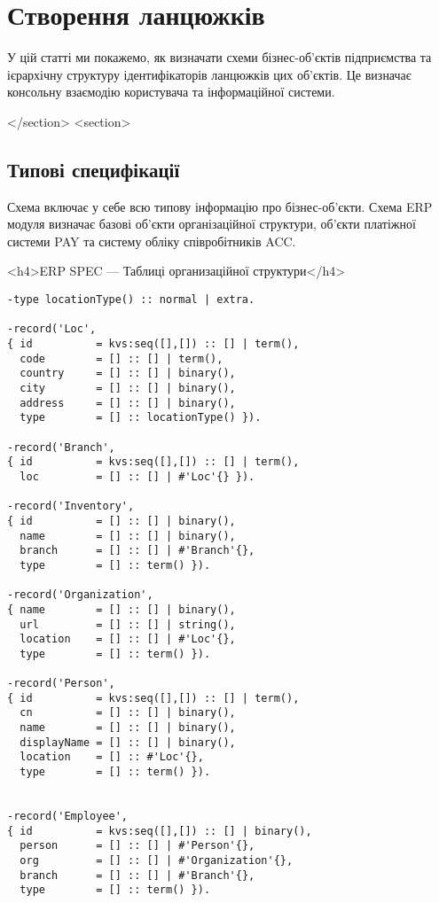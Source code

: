 \chapter{Створення ланцюжків}

        У цій статті ми покажемо, як визначати схеми бізнес-об'єктів
           підприємства та ієрархічну структуру ідентифікаторів ланцюжків
           цих об'єктів. Це визначає консольну взаємодію користувача
           та інформаційної системи.

    </section>
    <section>


        \section{Типові специфікації}

        Схема включає у себе всю типову інформацію про бізнес-об'єкти.
           Схема ERP модуля визначає базові об'єкти організаційної структури,
           об'єкти платіжної системи PAY та систему обліку співробітників ACC.

        <h4>ERP SPEC — Таблиці организаційної структури</h4>

   \begin{lstlisting}
-type locationType() :: normal | extra.

-record('Loc',
{ id          = kvs:seq([],[]) :: [] | term(),
  code        = [] :: [] | term(),
  country     = [] :: [] | binary(),
  city        = [] :: [] | binary(),
  address     = [] :: [] | binary(),
  type        = [] :: locationType() }).

-record('Branch',
{ id          = kvs:seq([],[]) :: [] | term(),
  loc         = [] :: [] | #'Loc'{} }).

-record('Inventory',
{ id          = [] :: [] | binary(),
  name        = [] :: [] | binary(),
  branch      = [] :: [] | #'Branch'{},
  type        = [] :: term() }).

-record('Organization',
{ name        = [] :: [] | binary(),
  url         = [] :: [] | string(),
  location    = [] :: [] | #'Loc'{},
  type        = [] :: term() }).

-record('Person',
{ id          = kvs:seq([],[]) :: [] | term(),
  cn          = [] :: [] | binary(),
  name        = [] :: [] | binary(),
  displayName = [] :: [] | binary(),
  location    = [] :: #'Loc'{},
  type        = [] :: term() }).


-record('Employee',
{ id          = kvs:seq([],[]) :: [] | binary(),
  person      = [] :: [] | #'Person'{},
  org         = [] :: [] | #'Organization'{},
  branch      = [] :: [] | #'Branch'{},
  type        = [] :: term() }).
    \end{lstlisting}

